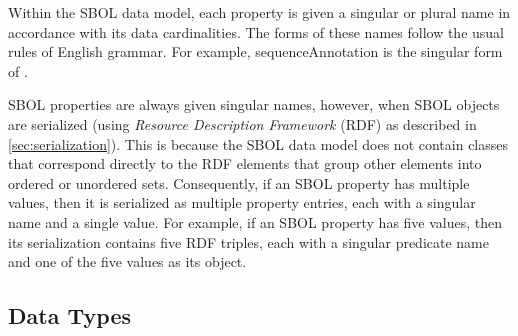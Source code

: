 Within the SBOL data model, each property is given a singular or plural name in accordance with its data cardinalities.
The forms of these names follow the usual rules of English grammar. For example, sequenceAnnotation is the singular form of .

SBOL properties are always given singular names, however, when SBOL objects are serialized (using \emph{Resource Description Framework} (RDF) as described in \ref{sec:serialization}).
This is because the SBOL data model does not contain classes that correspond directly to the RDF elements that group other elements into ordered or unordered sets. Consequently, if an SBOL property has multiple values, then it is serialized as multiple property entries, each with a singular name and a single value.
For example, if an SBOL property has five values, then its serialization contains five RDF triples, each with a singular predicate name and one of the five values as its object.

\subsection{Data Types}
\label{sec:datatypes}
\label{sec:String}
\label{sec:Integer}
\label{sec:Long}
\label{sec:Double}
\label{sec:Boolean}
\label{sec:URI}
\label{sec:literal}


